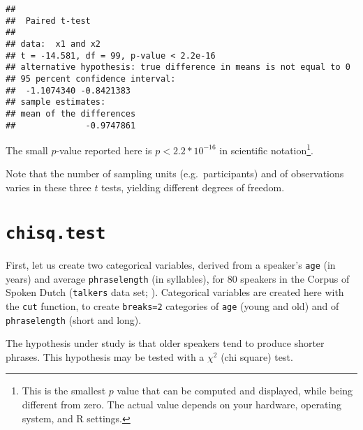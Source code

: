 \documentclass[
]{book}
\newenvironment{Shaded}{\begin{snugshade}}{\end{snugshade}}
\newcommand{\AttributeTok}[1]{\textcolor[rgb]{0.77,0.63,0.00}{#1}}
\newcommand{\DecValTok}[1]{\textcolor[rgb]{0.00,0.00,0.81}{#1}}
\newcommand{\FunctionTok}[1]{\textcolor[rgb]{0.00,0.00,0.00}{#1}}
\newcommand{\NormalTok}[1]{#1}
\newcommand{\OtherTok}[1]{\textcolor[rgb]{0.56,0.35,0.01}{#1}}
\newcommand{\SpecialCharTok}[1]{\textcolor[rgb]{0.00,0.00,0.00}{#1}}
\begin{document}
\begin{verbatim}
## 
##  Paired t-test
## 
## data:  x1 and x2
## t = -14.581, df = 99, p-value < 2.2e-16
## alternative hypothesis: true difference in means is not equal to 0
## 95 percent confidence interval:
##  -1.1074340 -0.8421383
## sample estimates:
## mean of the differences 
##              -0.9747861
\end{verbatim}

The small \(p\)-value reported here is \(p < 2.2 * 10^{-16}\) in scientific notation\footnote{This is the smallest \(p\) value that can be computed and displayed, while being different from zero. The actual value depends on your hardware, operating system, and R settings.}.

Note that the number of sampling units (e.g.~participants) and of observations varies in these three \(t\) tests, yielding different degrees of freedom.

\hypertarget{chisq.test}{%
\section{\texorpdfstring{\texttt{chisq.test}}{chisq.test}}\label{chisq.test}}

First, let us create two categorical variables, derived from a
speaker's \texttt{age} (in years) and average \texttt{phraselength} (in
syllables), for 80 speakers in the Corpus of Spoken Dutch (\texttt{talkers} data set; \citep{R-hqmisc}).
Categorical variables are created here with the
\texttt{cut} function, to create
\texttt{breaks=2} categories of \texttt{age} (young and
old) and of \texttt{phraselength} (short and long).

\begin{Shaded}
\end{Shaded}

The hypothesis under study is that older speakers tend to produce
shorter phrases. This hypothesis may be tested with a \(\chi^2\) (chi
square) test.\\
\end{document}
